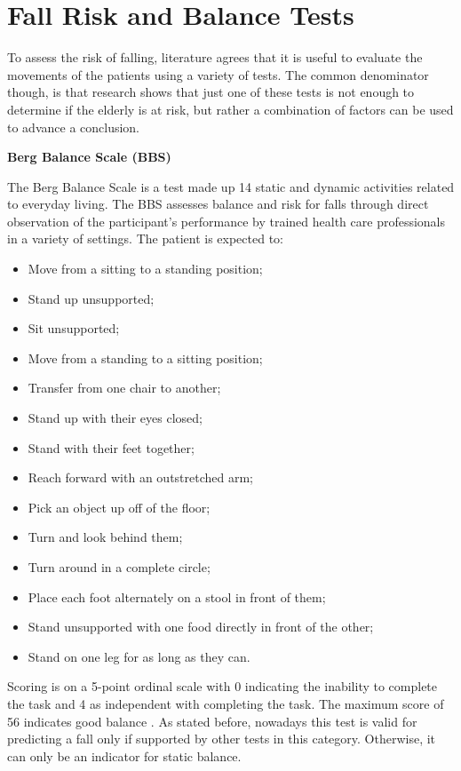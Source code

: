 \section{Fall Risk and Balance Tests}
To assess the risk of falling, literature agrees that it is useful to evaluate the movements of the patients using a variety of tests. The common denominator though, is that research shows that just one of these tests is not enough to determine if the elderly is at risk, but rather a combination of factors can be used to advance a conclusion.

\vspace{0.3cm}
\textbf{Berg Balance Scale (BBS)}

The Berg Balance Scale is a test made up 14 static and dynamic activities related to everyday living. The BBS assesses balance and risk for falls through direct observation of the participant's performance by trained health care professionals in a variety of settings. The patient is expected to:
\begin{itemize}
\itemsep0cm 
    \item Move from a sitting to a standing position;
    \item Stand up unsupported;
    \item Sit unsupported;
    \item Move from a standing to a sitting position;
    \item Transfer from one chair to another;
    \item Stand up with their eyes closed;
    \item Stand with their feet together;
    \item Reach forward with an outstretched arm;
    \item Pick an object up off of the floor;
    \item Turn and look behind them;
    \item Turn around in a complete circle;
    \item Place each foot alternately on a stool in front of them;
    \item Stand unsupported with one food directly in front of the other;
    \item Stand on one leg for as long as they can.
\end{itemize}
Scoring is on a 5-point ordinal scale with 0 indicating the inability to complete the task and 4 as independent with completing the task. The maximum score of 56 indicates good balance \cite{BergBalanceScale}. As stated before, nowadays this test is valid for predicting a fall only if supported by other tests in this category. Otherwise, it can only be an indicator for static balance.

